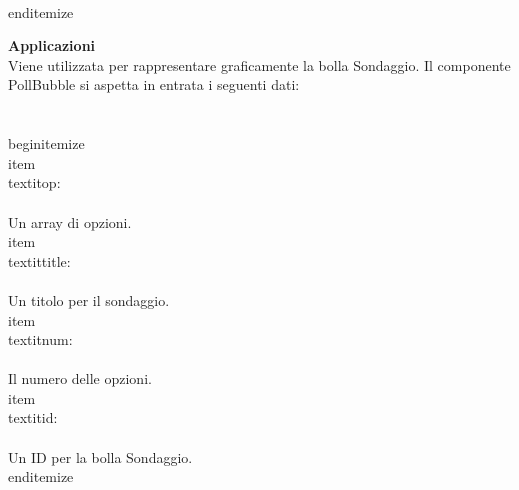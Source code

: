 \\end{itemize} 


\textbf{Applicazioni}\\
Viene utilizzata per rappresentare graficamente la bolla Sondaggio.
Il componente PollBubble si aspetta in entrata i seguenti dati: \\\\
\\begin{itemize}
\\item \\textit{op}:
\\\\
Un array di opzioni.
\\item \\textit{title}:
\\\\
Un titolo per il sondaggio.
\\item \\textit{num}:
\\\\
Il numero delle opzioni.
\\item \\textit{id}:
\\\\
Un ID per la bolla Sondaggio.
\\end{itemize} 


\clearpage

